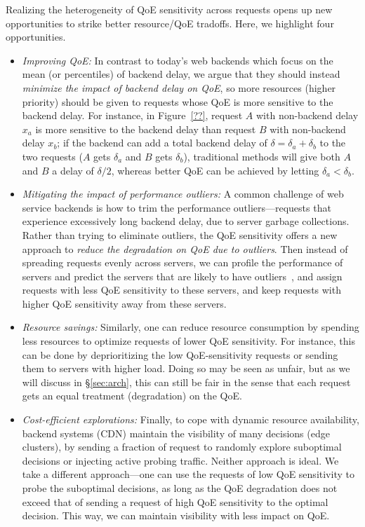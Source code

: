 Realizing the heterogeneity of QoE sensitivity across requests opens up new opportunities to strike better resource/QoE tradoffs. 
Here, we highlight four opportunities.
\begin{itemize}
    \item {\em Improving QoE:} 
    In contrast to today's web backends which focus on the mean (or percentiles) of backend delay, we argue that they should instead {\em minimize the impact of backend delay on QoE}, so more resources (\eg higher priority) should be given to requests whose QoE is more sensitive to the backend delay. 
    For instance, in Figure~\ref{??}, request $A$ with non-backend delay $x_a$ is more sensitive to the backend delay than request $B$ with non-backend delay $x_b$; if the backend can add a total backend delay of $\delta=\delta_a+\delta_b$ to the two requests ($A$ gets $\delta_a$ and $B$ gets $\delta_b$), traditional methods will give both $A$ and $B$ a delay of $\delta/2$, whereas better QoE can be achieved by letting $\delta_a<\delta_b$.
    
    \item {\em Mitigating the impact of performance outliers:} 
    A common challenge of web service backends is how to trim the performance outliers---requests that experience excessively long backend delay, \eg due to server garbage collections. 
    Rather than trying to eliminate outliers, the QoE sensitivity offers a new approach to {\em reduce the degradation on QoE due to outliers}.
    Then instead of spreading requests evenly across servers, we can profile the performance of servers and predict the servers that are likely to have outliers~\cite{ganesh's trimming}, and assign requests with less QoE sensitivity to these servers, and keep requests with higher QoE sensitivity away from these servers. 
    
    \item {\em Resource savings:}
    Similarly, one can reduce resource consumption by spending less resources to optimize requests of lower QoE sensitivity. For instance, this can be done by deprioritizing the low QoE-sensitivity requests or sending them to servers with higher load.
    Doing so may be seen as unfair, but as we will discuss in \S\ref{sec:arch}, this can still be fair in the sense that each request gets an equal treatment (degradation) on the QoE.
    
    \item {\em Cost-efficient explorations:}
    Finally, to cope with dynamic resource availability, backend systems (\eg CDN) maintain the visibility of many decisions (\eg edge clusters), by sending a fraction of request to randomly explore suboptimal decisions or injecting active probing traffic.
    Neither approach is ideal. 
    We take a different approach---one can use the requests of low QoE sensitivity to probe the suboptimal decisions, as long as the QoE degradation does not exceed that of sending a request of high QoE sensitivity to the optimal decision.
    This way, we can maintain visibility with less impact on QoE.
    
\end{itemize}

